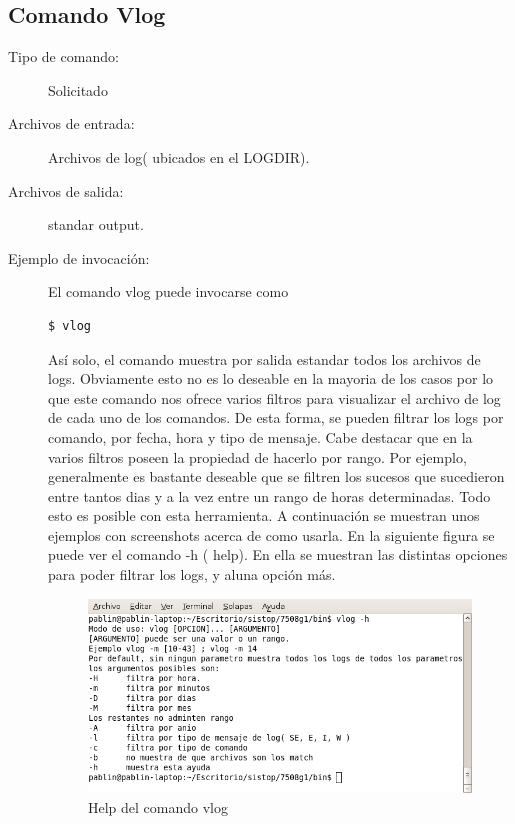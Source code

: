\documentclass[12pt]{article}
\begin{document}
\subsection{Comando Vlog}
\begin{description}
	\item [Tipo de comando:] Solicitado
	
	\item [Archivos de entrada:] Archivos de log( ubicados en el LOGDIR).
	
	\item [Archivos de salida:] standar output.
	
	\item [Ejemplo de invocación:] El comando vlog puede invocarse como
	\begin{verbatim}$ vlog\end{verbatim}
        Así solo, el comando muestra por salida estandar todos los archivos de logs. 
        Obviamente esto no es lo deseable en la mayoria de los casos por lo que este comando nos ofrece varios filtros para visualizar el archivo de log de cada uno de los comandos. 
        De esta forma, se pueden filtrar los logs por comando, por fecha, hora y tipo de mensaje. 
        Cabe destacar que en la varios filtros poseen la propiedad de hacerlo por rango. 
        Por ejemplo, generalmente es bastante deseable que se filtren los sucesos que sucedieron entre tantos dias y a la vez entre un rango de horas determinadas. 
        Todo esto es posible con esta herramienta. A continuación se muestran unos ejemplos con screenshots acerca de como usarla.
        En la siguiente figura se puede ver el comando -h ( help). En ella se muestran las distintas opciones para poder filtrar los logs, y aluna opci\'on m\'as.

	\begin{figure}[H]
	\centering
	\includegraphics[scale=0.55]{imagenes/vlog/vlog_help.png}
	\caption{Help del comando vlog}
	\end{figure}


\end{description}
\end{document}
